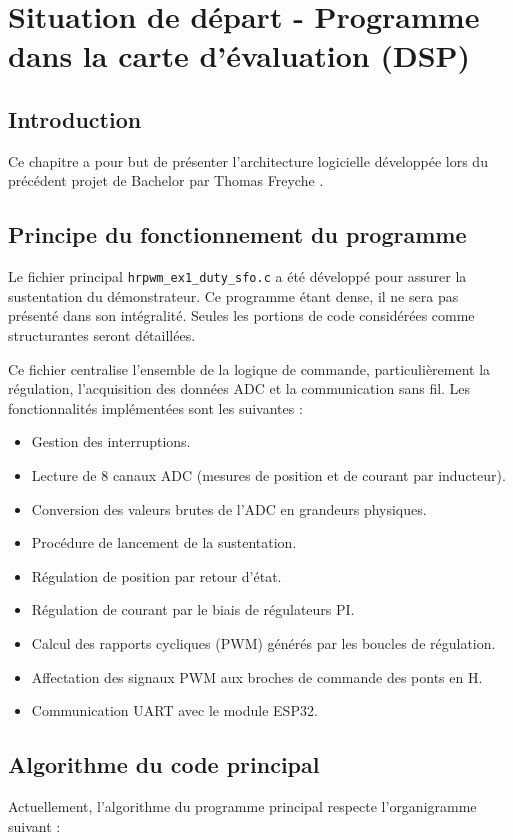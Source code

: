 \chapter{Situation de départ - Programme dans la carte d'évaluation (DSP)}

\section{Introduction}
Ce chapitre a pour but de présenter l'architecture logicielle développée lors du précédent projet de Bachelor par Thomas Freyche \cite{Freyche}.

\section{Principe du fonctionnement du programme}
Le fichier principal \texttt{hrpwm\_ex1\_duty\_sfo.c} a été développé pour assurer la sustentation du démonstrateur. Ce programme étant dense, il ne sera pas présenté dans son intégralité. Seules les portions de code considérées comme structurantes seront détaillées.

Ce fichier centralise l'ensemble de la logique de commande, particulièrement la régulation, l'acquisition des données ADC et la communication sans fil. Les fonctionnalités implémentées sont les suivantes :

\begin{itemize}
    \item Gestion des interruptions.
    \item Lecture de 8 canaux ADC (mesures de position et de courant par inducteur).
    \item Conversion des valeurs brutes de l'ADC en grandeurs physiques.
    \item Procédure de lancement de la sustentation.
    \item Régulation de position par retour d'état.
    \item Régulation de courant par le biais de régulateurs PI.
    \item Calcul des rapports cycliques (PWM) générés par les boucles de régulation.
    \item Affectation des signaux PWM aux broches de commande des ponts en H.
    \item Communication UART avec le module ESP32.
\end{itemize}

\section{Algorithme du code principal}
\label{sec:Algo}
Actuellement, l'algorithme du programme principal respecte l'organigramme suivant :

